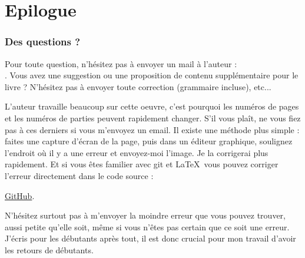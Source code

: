 ﻿\part*{Epilogue}

\section{Des questions ?}

Pour toute question, n'hésitez pas à envoyer un mail à l'auteur : \\
\GTT{<\EMAIL>}.
Vous avez une suggestion ou une proposition de contenu supplémentaire pour le livre ?
N'hésitez pas à envoyer toute correction (grammaire incluse), etc...

L'auteur travaille beaucoup sur cette oeuvre, c'est pourquoi les numéros de pages et les numéros de parties peuvent rapidement changer.
S'il vous plaît, ne vous fiez pas à ces derniers si vous m'envoyez un email. 
Il existe une méthode plus simple : faites une capture d'écran de la page, puis dans un éditeur graphique, soulignez l'endroit où il y a une erreur et envoyez-moi l'image. Je la corrigerai plus rapidement.
Et si vous êtes familier avec git et \LaTeX\, vous pouvez corriger l'erreur directement dans le code source :

\href{http://go.yurichev.com/17089}{GitHub}.

N'hésitez surtout pas à m'envoyer la moindre erreur que vous pouvez trouver, aussi petite qu'elle soit, même si vous n'êtes pas certain que ce soit une erreur.
J'écris pour les débutants après tout, il est donc crucial pour mon travail d'avoir les retours de débutants.

